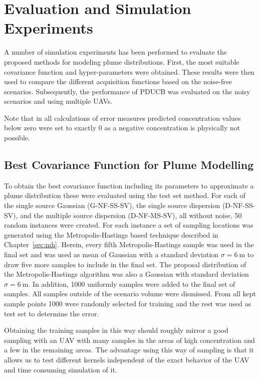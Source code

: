 \chapter{Evaluation and Simulation Experiments}\label{sec:exp}
A number of simulation experiments has been performed to evaluate the proposed 
methods for modeling plume distributions. First, the most suitable covariance 
function and hyper-parameters were obtained. These results were then used to 
compare the different acquisition functions based on the noise-free scenarios.  
Subsequently, the performance of PDUCB was evaluated on the noisy scenarios and 
using multiple UAVs.

Note that in all calculations of error measures predicted concentration values 
below zero were set to exactly 0 as a negative concentration is physically not 
possible.

\section{Best Covariance Function for Plume Modelling}\label{sec:bestkernel}
To obtain the best covariance function including its parameters to approximate 
a plume distribution these were evaluated using the test set method. For each of 
the single source Gaussian (G-NF-SS-SV), the single source dispersion 
(D-NF-SS-SV), and the multiple source dispersion (D-NF-MS-SV), all without 
noise, 50 random instances were created. For each instance a set of sampling 
locations was generated using the Metropolis-Hastings based technique described 
in Chapter~\ref{sec:mh}. Herein, every fifth Metropolis-Hastings sample was used 
in the final set and was used as mean of Gaussian with a standard deviation 
$\sigma = \SI{6}{\meter}$ to draw five more samples to include in the final set.  
The proposal distribution of the Metropolis-Hastings algorithm was also 
a Gaussian with standard deviation $\sigma = \SI{6}{\meter}$. In addition, 1000 
uniformly samples were added to the final set of samples. All samples outside of 
the scenario volume were dismissed. From all kept sample points 1000 were 
randomly selected for training and the rest was used as test set to determine 
the error.

Obtaining the training samples in this way should roughly mirror a good sampling 
with an UAV with many samples in the areas of high concentration and a few in 
the remaining areas. The advantage using this way of sampling is that it allows 
us to test different kernels independent of the exact behavior of the UAV and 
time consuming simulation of it.

